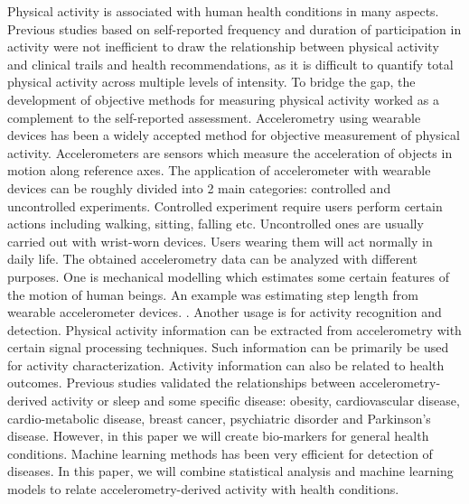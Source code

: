 \documentclass[12pt]{article}
\begin{document}
Physical activity is associated with human health conditions in many
aspects. \citep{doherty2017large} Previous studies based on
self-reported frequency and duration of participation in activity were
not inefficient to draw the relationship between physical activity and
clinical trails and health recommendations, as it is difficult to
quantify total physical activity across multiple levels of intensity. To
bridge the gap, the development of objective methods for measuring
physical activity worked as a complement to the self-reported
assessment. Accelerometry using wearable devices has been a widely
accepted method for objective measurement of physical activity.
Accelerometers are sensors which measure the acceleration of objects in
motion along reference axes. The application of accelerometer with
wearable devices can be roughly divided into 2 main categories:
controlled and uncontrolled experiments. Controlled experiment require
users perform certain actions including walking, sitting, falling etc.
\citep[\citet{casale2011human}]{nho2020cluster} Uncontrolled ones are
usually carried out with wrist-worn devices. Users wearing them will act
normally in daily life. The obtained accelerometry data can be analyzed
with different purposes. One is mechanical modelling which estimates
some certain features of the motion of human beings. An example was
estimating step length from wearable accelerometer devices.
\citep{alvarez2006comparison}. Another usage is for activity recognition
and detection. Physical activity information can be extracted from
accelerometry with certain signal processing techniques. Such
information can be primarily be used for activity characterization.
\citep[\citet{ravi2005activity},
\citet{yang2010review}]{willetts2018statistical} Activity information
can also be related to health outcomes. Previous studies validated the
relationships between accelerometry-derived activity or sleep and some
specific disease: obesity, cardiovascular disease, cardio-metabolic
disease, breast cancer, psychiatric disorder and Parkinson's
disease.\citep[\citet{guo2020physical},
\citet{ramakrishnan2021accelerometer}, \citet{barker2019physical},
\citet{cassidy2018accelerometer}, \citet{dennison2021association},
\citet{nikbakhtian2021accelerometer}]{guo2019accelerometer} However, in
this paper we will create bio-markers for general health conditions.
Machine learning methods has been very efficient for detection of
diseases. \citep{kubota2016machine} In this paper, we will combine
statistical analysis and machine learning models to relate
accelerometry-derived activity with health conditions.
\end{document}
